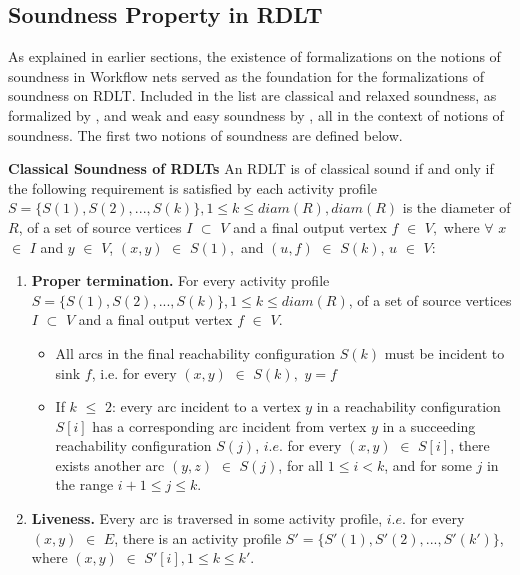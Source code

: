 \subsection*{Soundness Property in RDLT}
As explained in earlier sections, the existence of formalizations on the notions of soundness in Workflow nets served as the foundation for the formalizations of soundness on RDLT. Included in the list are classical and relaxed soundness, as formalized by \cite{Malinao2017}, and weak and easy soundness by \cite{Ramirez2024}, all in the context of notions of soundness. The first two notions of soundness are defined below.
\begin{defn}\textbf{Classical Soundness of RDLTs} \cite{MalinaoPJS2023}
    \label{ClassicalRDLTDef}
    An RDLT is of classical sound if and only if the following requirement is satisfied by each activity profile $ S = \{S(1), S(2), ..., S(k)\}, 1 \leq k \leq diam(R), diam(R) $ is the diameter of $ R $, of a set of source vertices $ I $ $ \subset $ $ V $ and a final output vertex $ f $ $ \in $ $ V, $ where $ \forall $ $ x $ $ \in $ $ I $ and $ y $ $ \in $ $ V $, $ (x,y) $ $ \in $ $ S(1), $ and $ (u,f) $ $ \in $ $ S(k) $, $ u $ $ \in $ $ V $:
    \begin{enumerate}
        \item \textbf{Proper termination.} For every activity profile $ S = \{S(1), S(2), ..., S(k)\}, 1 \leq k \leq diam(R) $, of a set of source vertices $ I $ $ \subset $ $ V $ and a final output vertex $ f $ $ \in $ $ V $.
        \begin{itemize}
            \item All arcs in the final reachability configuration $ S(k) $ must be incident to sink $ f $, i.e. for every $ (x,y) $ $ \in $ $ S(k), $ $ y = f $
            \item If $ k $ $ \leq $ $ 2 $: every arc incident to a vertex $ y $ in a reachability configuration $ S[i] $ has a corresponding arc incident from vertex $ y $ in a succeeding reachability configuration $ S(j) $, $ i.e. $ for every $ (x,y) $ $ \in $ $ S[i] $, there exists another arc $ (y,z) $ $ \in $ $ S(j) $, for all $ 1 \leq i < k $, and for some $ j $ in the range $ i + 1 \leq j \leq k $.
        \end{itemize}
        \item \textbf{Liveness.} Every arc is traversed in some activity profile, $ i.e. $ for every $ (x,y) $ $ \in $ $ E $, there is an activity profile $ S' = \{S'(1), S'(2), ..., S'(k')\} $, where $ (x,y) $ $ \in $ $ S'[i], 1 \leq k \leq k' $.
    \end{enumerate}
\end{defn}

